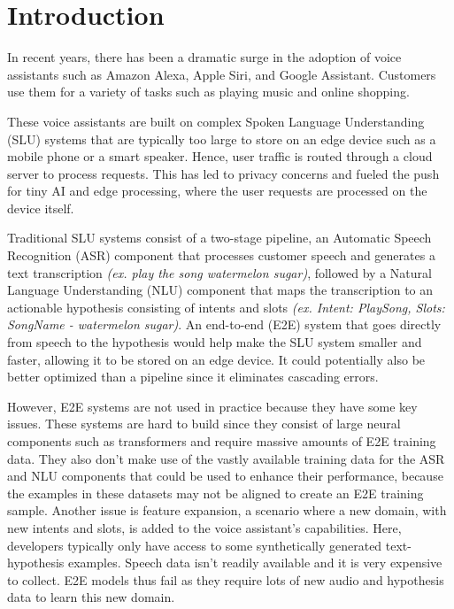 \documentclass[letterpaper]{article} \usepackage{aaai21}  \usepackage{times}  \usepackage{helvet} \usepackage{courier}  \usepackage[hyphens]{url}  \usepackage{graphicx} \usepackage{booktabs}
\begin{document}
\section{Introduction}
In recent years, there has been a dramatic surge in the adoption of voice assistants such as Amazon Alexa, Apple Siri, and Google Assistant. Customers use them for a variety of tasks such as playing music and online shopping.

These voice assistants are built on complex Spoken Language Understanding (SLU) systems that are typically too large to store on an edge device such as a mobile phone or a smart speaker. Hence, user traffic is routed through a cloud server to process requests. This has led to privacy concerns and fueled the push for tiny AI and edge processing, where the user requests are processed on the device itself. 

Traditional SLU systems consist of a two-stage pipeline, an Automatic Speech Recognition (ASR) component that processes customer speech and generates a text transcription \emph{(ex. play the song watermelon sugar)}, followed by a Natural Language Understanding (NLU) component that maps the transcription to an actionable hypothesis consisting of intents and slots \emph{(ex. Intent: PlaySong, Slots: SongName - watermelon sugar)}. An end-to-end (E2E) system that goes directly from speech to the hypothesis would help make the SLU system smaller and faster, allowing it to be stored on an edge device. It could potentially also be better optimized than a pipeline since it eliminates cascading errors.

However, E2E systems are not used in practice because they have some key issues. These systems are hard to build since they consist of large neural components such as transformers and require massive amounts of E2E training data. They also don't make use of the vastly available training data for the ASR and NLU components that could be used to enhance their performance, because the examples in these datasets may not be aligned to create an E2E training sample. Another issue is feature expansion, a scenario where a new domain, with new intents and slots, is added to the voice assistant's capabilities. Here, developers typically only have access to some synthetically generated text-hypothesis examples. Speech data isn't readily available and it is very expensive to collect. E2E models thus fail as they require lots of new audio and hypothesis data to learn this new domain.
\end{document}
